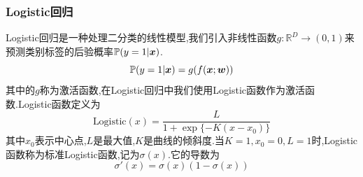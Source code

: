 \subsubsection{Logistic回归}
Logistic回归是一种处理二分类的线性模型,我们引入非线性函数$g:\mathbb{R}^D\to (0,1)$来预测类别标签的后验概率$\mathbb{P}(y=1|\bm{x})$.
$$
\mathbb{P}(y=1|\bm{x})=g(f(\bm{x};\bm{w}))
$$
其中的$g$称为激活函数,在Logistic回归中我们使用Logistic函数作为激活函数.Logistic函数定义为
$$
\text{Logistic}(x)=\frac{L}{1+\exp\{-K(x-x_0)\}}
$$
其中$x_0$表示中心点,$L$是最大值,$K$是曲线的倾斜度.当$K=1,x_0=0,L=1$时,Logistic函数称为标准Logistic函数,记为$\sigma (x)$.它的导数为
$$
\sigma '(x)=\sigma (x)(1-\sigma (x))
$$






















































